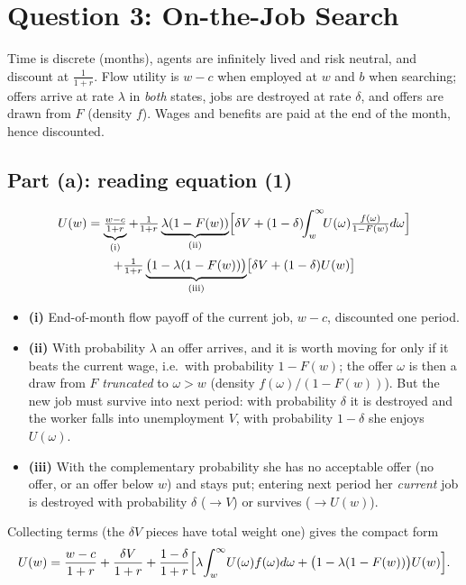 \documentclass[11pt]{article}
\begin{document}
\section*{Question 3: On-the-Job Search}

Time is discrete (months), agents are infinitely lived and risk neutral, and
discount at $\tfrac1{1+r}$. Flow utility is $w-c$ when employed at $w$ and $b$
when searching; offers arrive at rate $\lambda$ in \emph{both} states, jobs are
destroyed at rate $\delta$, and offers are drawn from $F$ (density $f$). Wages
and benefits are paid at the end of the month, hence discounted.

\subsection*{Part (a): reading equation (1)}

\begin{multline*}
U(w)=\underbrace{\tfrac{w-c}{1+r}}_{\text{(i)}}
 +\tfrac{1}{1+r}\underbrace{\lambda(1-F(w))}_{\text{(ii)}}
   \Bigl[\delta V+(1-\delta)\!\!\int_w^\infty\!\! U(\omega)\tfrac{f(\omega)}{1-F(w)}d\omega\Bigr]\\
 +\tfrac{1}{1+r}\underbrace{\bigl(1-\lambda(1-F(w))\bigr)}_{\text{(iii)}}
   \bigl[\delta V+(1-\delta)U(w)\bigr]
\end{multline*}
\begin{itemize}[nosep]
\item \textbf{(i)} End-of-month flow payoff of the current job, $w-c$,
discounted one period.
\item \textbf{(ii)} With probability $\lambda$ an offer arrives, and it is worth
moving for only if it beats the current wage, i.e.\ with probability
$1-F(w)$; the offer $\omega$ is then a draw from $F$ \emph{truncated} to
$\omega>w$ (density $f(\omega)/(1-F(w))$). But the new job must survive into next
period: with probability $\delta$ it is destroyed and the worker falls into
unemployment $V$, with probability $1-\delta$ she enjoys $U(\omega)$.
\item \textbf{(iii)} With the complementary probability she has no acceptable
offer (no offer, or an offer below $w$) and stays put; entering next period her
\emph{current} job is destroyed with probability $\delta$ ($\rightarrow V$) or survives
($\rightarrow U(w)$).
\end{itemize}
Collecting terms (the $\delta V$ pieces have total weight one) gives the compact
form
\begin{equation}\label{eq:A}
U(w)=\frac{w-c}{1+r}+\frac{\delta V}{1+r}
   +\frac{1-\delta}{1+r}\Bigl[\lambda\!\int_w^\infty\!U(\omega)f(\omega)d\omega
      +\bigl(1-\lambda(1-F(w))\bigr)U(w)\Bigr].
\end{equation}
\end{document}
